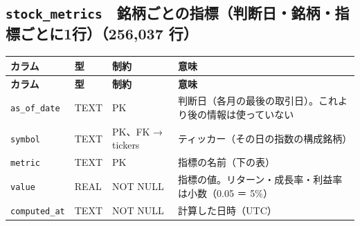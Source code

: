 \documentclass[xelatex,ja=standard,jafont=hiragino-pron,a4paper,10pt]{bxjsreport}
\begin{document}
\subsection*{\texttt{stock\_\allowbreak{}metrics}　銘柄ごとの指標（判断日・銘柄・指標ごとに1行）（256,037 行）}
{\footnotesize
\begin{longtable}{p{3.30cm}p{1.40cm}p{3.00cm}p{6.40cm}}
\toprule
\textbf{カラム} & \textbf{型} & \textbf{制約} & \textbf{意味} \\
\midrule
\endfirsthead
\toprule
\textbf{カラム} & \textbf{型} & \textbf{制約} & \textbf{意味} \\
\midrule
\endhead
\bottomrule
\endfoot
\texttt{as\_\allowbreak{}of\_\allowbreak{}date} & TEXT & PK & 判断日（各月の最後の取引日）。これより後の情報は使っていない \\
\texttt{symbol} & TEXT & PK、FK → tickers & ティッカー（その日の指数の構成銘柄） \\
\texttt{metric} & TEXT & PK & 指標の名前（下の表） \\
\texttt{value} & REAL & NOT NULL & 指標の値。リターン・成長率・利益率は小数（0.05 ＝ 5\%） \\
\texttt{computed\_\allowbreak{}at} & TEXT & NOT NULL & 計算した日時（UTC） \\
\end{longtable}
}
\end{document}
